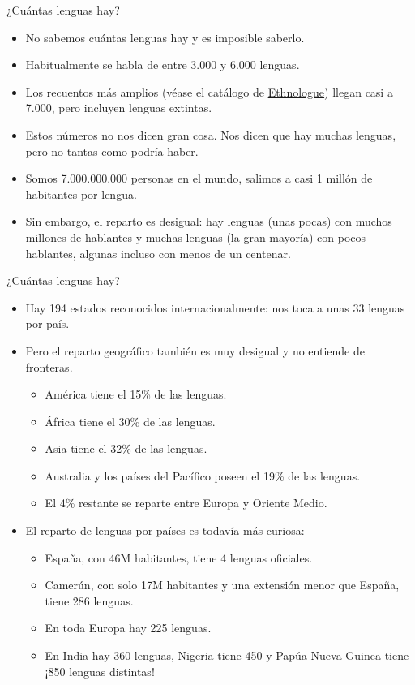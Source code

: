 \documentclass[handout]{beamer}
\begin{document}
\begin{frame}{¿Cuántas lenguas hay?}
\begin{itemize}

	\item No sabemos cuántas lenguas hay y es imposible saberlo.
	\item Habitualmente se habla de entre 3.000 y 6.000 lenguas. 
	\item Los recuentos más amplios (véase el catálogo de \href{http://www.ethnologue.com}{Ethnologue}) llegan casi a 7.000, pero incluyen lenguas extintas.
	\item Estos números no nos dicen gran cosa. Nos dicen que hay muchas lenguas, pero no tantas como podría haber. 
	\item Somos 7.000.000.000 personas en el mundo, salimos a casi 1 millón de habitantes por lengua.
	\item Sin embargo, el reparto es desigual: hay lenguas (unas pocas) con muchos millones de hablantes y muchas lenguas (la gran mayoría) con pocos hablantes, algunas incluso con menos de un centenar.
\end{itemize}

\end{frame}

\begin{frame}{¿Cuántas lenguas hay?}
\begin{itemize}
	\item Hay 194 estados reconocidos internacionalmente: nos toca a unas 33 lenguas por país.
	\item Pero el reparto geográfico también es muy desigual y no entiende de fronteras.
		\begin{itemize}
			\item América tiene el 15\% de las lenguas.
			\item África tiene el 30\% de las lenguas.
			\item Asia tiene el 32\% de las lenguas.
			\item Australia y los países del Pacífico poseen el 19\% de las lenguas.
			\item El 4\% restante se reparte entre Europa y Oriente Medio.
		\end{itemize}
	\item El reparto de lenguas por países es todavía más curiosa:
	\begin{itemize}
		\item España, con 46M habitantes, tiene 4 lenguas oficiales.
		\item Camerún, con solo 17M habitantes y una extensión menor que España, tiene 286 lenguas. 
		\item En toda Europa hay 225 lenguas.
		\item En India hay 360 lenguas, Nigeria tiene 450 y Papúa Nueva Guinea tiene ¡850 lenguas distintas!
	\end{itemize}
\end{itemize}
\end{frame}
\end{document}
